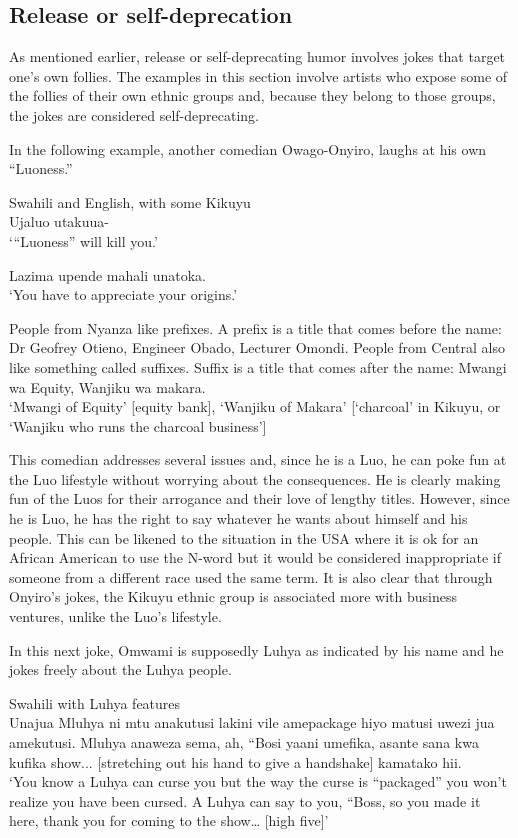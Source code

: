 \documentclass[output=paper]{langsci/langscibook}
\begin{document}
\subsection{Release or self-deprecation}

As mentioned earlier, release or self-deprecating humor involves jokes that target one’s own follies. The examples in this section involve artists who expose some of the follies of their own ethnic groups and, because they belong to those groups, the jokes are considered self-deprecating. 

In the following example, another comedian Owago-Onyiro, laughs at his own “Luoness.”

\ea\label{ex:muaka:10}
{Swahili and English, with some Kikuyu}\\
   Ujaluo utakuua-\\
\glt ‘“Luoness” will kill you.’
\z

\ea
 Lazima upende mahali unatoka.\\
\glt ‘You have to appreciate your origins.’ 
\z

\ea
 People from Nyanza like prefixes. A prefix is a title that comes before the name: Dr Geofrey Otieno, Engineer Obado, Lecturer Omondi. People from Central also like something called suffixes. Suffix is a title that comes after the name: Mwangi wa Equity, Wanjiku wa makara.\\
\glt ‘Mwangi of Equity’ [equity bank], ‘Wanjiku of Makara’ [‘charcoal’ in Kikuyu, or ‘Wanjiku who runs the charcoal business’] \citep{Churchill2013}
\z

This comedian addresses several issues and, since he is a Luo, he can poke fun at the Luo lifestyle without worrying about the consequences. He is clearly making fun of the Luos for their arrogance and their love of lengthy titles. However, since he is Luo, he has the right to say whatever he wants about himself and his people. This can be likened to the situation in the USA where it is ok for an African American to use the N-word but it would be considered inappropriate if someone from a different race used the same term. It is also clear that through Onyiro’s jokes, the Kikuyu ethnic group is associated more with business ventures, unlike the Luo’s lifestyle. 

In this next joke, Omwami is supposedly Luhya as indicated by his name and he jokes freely about the Luhya people.

\ea
{Swahili with Luhya features}\\
 Unajua Mluhya ni mtu anakutusi lakini vile amepackage hiyo matusi uwezi jua amekutusi. Mluhya anaweza sema, ah, “Bosi yaani umefika, asante sana kwa kufika show... \textup{[stretching out his hand to give a handshake]} kamatako hii.\\
‘You know a Luhya can curse you but the way the curse is “packaged” you won’t realize you have been cursed. A Luhya can say to you, “Boss, so you made it here, thank you for coming to the show… [high five]’ \citep{ChurchillRaw2014}
\z
\end{document}
